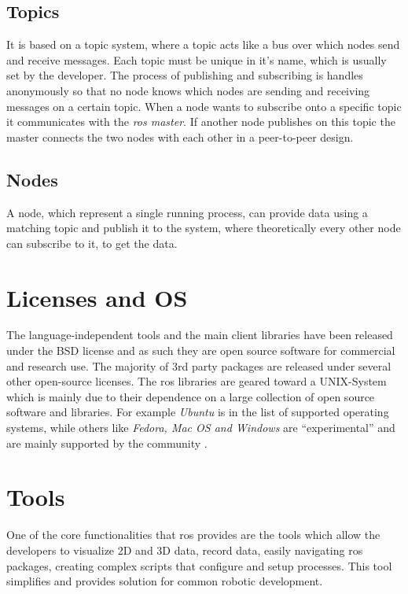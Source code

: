 \subsection{Topics}
It is based on a topic system, where a topic acts like a bus over which nodes send and receive messages. Each topic must be unique in it's name, which is usually set by the developer. The process of publishing and subscribing is handles anonymously so that no node knows which nodes are sending and receiving messages on a certain topic. When a node wants to subscribe onto a specific topic it communicates with the \textit{\gls{ros} master}. If another node publishes on this topic the master connects the two nodes with each other in a peer-to-peer design.

\subsection{Nodes}
A node, which represent a single running process, can provide data using a matching topic and publish it to the system, where theoretically every other node can subscribe to it, to get the data. 

\section{Licenses and OS}
The language-independent tools and the main client libraries have been released under the BSD license and as such they are open source software for commercial and research use. The majority of 3rd party packages are released under several other open-source licenses.\newline
The \gls{ros} libraries are geared toward a UNIX-System which is mainly due to their dependence on a large collection of open source software and libraries.
For example \textit{Ubuntu} is in the list of supported operating systems, while others like \textit{Fedora, Mac OS and Windows} are \enquote{experimental} and are mainly supported by the community \cite{isrosforme}.

\section{Tools}
One of the core functionalities that \gls{ros} provides are the tools which allow the developers to visualize 2D and 3D data, record data, easily navigating \gls{ros} packages, creating complex scripts that configure and setup processes. This tool simplifies and provides solution for common robotic development.

